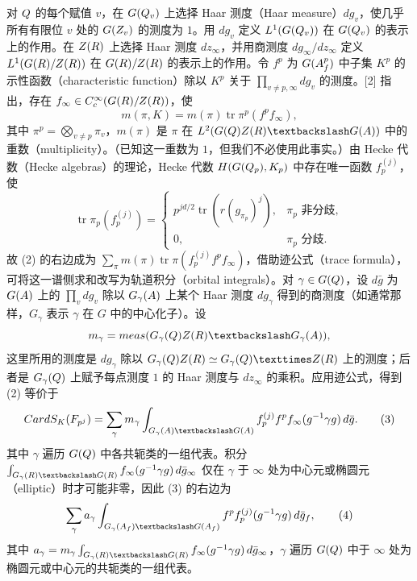 对 $Q$ 的每个赋值 $v$，在 $G(Q_v)$ 上选择 Haar 测度（Haar measure）$dg_v$，使几乎所有有限位 $v$ 处的 $G(Z_v)$ 的测度为 $1$。用 $dg_v$ 定义 $L^1(G(Q_v))$ 在 $G(Q_v)$ 的表示上的作用。在 $Z(R)$ 上选择 Haar 测度 $dz_\infty$，并用商测度 $dg_\infty/dz_\infty$ 定义 $L^1(G(R)/Z(R))$ 在 $G(R)/Z(R)$ 的表示上的作用。令 $f^p$ 为 $G(A_f^p)$ 中子集 $K^p$ 的示性函数（characteristic function）除以 $K^p$ 关于 $\prod_{v\ne p,\infty}dg_v$ 的测度。[2] 指出，存在
$f_\infty\in C_c^\infty(G(R)/Z(R))$，使
\[
m(\pi,K)=m(\pi)\operatorname{tr}\pi^p(f^pf_\infty),
\]
其中 $\pi^p=\bigotimes_{v\ne p}\pi_v$，$m(\pi)$ 是 $\pi$ 在 $L^2(G(\Q)Z(\R)\backslash G(\A))$ 中的重数（multiplicity）。（已知这一重数为 $1$，但我们不必使用此事实。）由 Hecke 代数（Hecke algebras）的理论，Hecke 代数 $H(G(Q_p),K_p)$ 中存在唯一函数 $f_p^{(j)}$，使
\[
\operatorname{tr}\pi_p(f_p^{(j)})=
\begin{cases}
p^{jd/2}\operatorname{tr}(r(g_{\pi_p})^j),&\pi_p\text{ 非分歧},\\
0,&\pi_p\text{ 分歧}.
\end{cases}
\]
故 (2) 的右边成为 $\sum_\pi m(\pi)\operatorname{tr}\pi(f_p^{(j)}f^pf_\infty)$，借助迹公式（trace formula），可将这一谱侧求和改写为轨道积分（orbital integrals）。对 $\gamma\in G(Q)$，设 $d\bar g$ 为 $G(A)$ 上的 $\prod_vdg_v$ 除以 $G_\gamma(A)$ 上某个 Haar 测度 $dg_\gamma$ 得到的商测度（如通常那样，$G_\gamma$ 表示 $\gamma$ 在 $G$ 中的中心化子）。设
\[
m_\gamma=\operatorname{meas}(G_\gamma(\Q)Z(\R)\backslash G_\gamma(\A)),
\]
这里所用的测度是 $dg_\gamma$ 除以 $G_\gamma(\Q)Z(\R)\simeq G_\gamma(\Q)\times Z(\R)$ 上的测度；后者是 $G_\gamma(Q)$ 上赋予每点测度 $1$ 的 Haar 测度与 $dz_\infty$ 的乘积。应用迹公式，得到 (2) 等价于
\begin{equation}
\operatorname{Card}S_K(\F_{p^j})=\sum_\gamma m_\gamma
\int_{G_\gamma(\A)\backslash G(\A)}f_p^{(j)}f^pf_\infty(g^{-1}\gamma g)\,d\bar g.\tag{3}
\end{equation}
其中 $\gamma$ 遍历 $G(Q)$ 中各共轭类的一组代表。积分
$\int_{G_\gamma(\R)\backslash G(\R)} f_\infty(g^{-1}\gamma g)\,d\bar g_\infty$
仅在 $\gamma$ 于 $\infty$ 处为中心元或椭圆元（elliptic）时才可能非零，因此 (3) 的右边为
\begin{equation}
\sum_\gamma a_\gamma\int_{G_\gamma(\A_f)\backslash G(\A_f)}
f^pf_p^{(j)}(g^{-1}\gamma g)\,d\bar g_f,\tag{4}
\end{equation}
其中
$a_\gamma=m_\gamma\int_{G_\gamma(\R)\backslash G(\R)}f_\infty(g^{-1}\gamma g)\,d\bar g_\infty$，$\gamma$ 遍历 $G(Q)$ 中于 $\infty$ 处为椭圆元或中心元的共轭类的一组代表。


